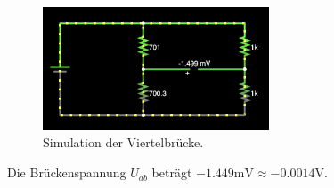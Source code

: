 \begin{figure}[!h]
    \centering
    \includegraphics[width=0.6\textwidth]{./figs/04_falstad_black.png}
    \caption{Simulation der Viertelbrücke.}
    \label{fig:quarter-bridge-simulation}
\end{figure}

Die Brückenspannung \( U_{ab} \) beträgt \( -1.449 \si{\milli\volt} \approx -0.0014 \si{\volt} \).

